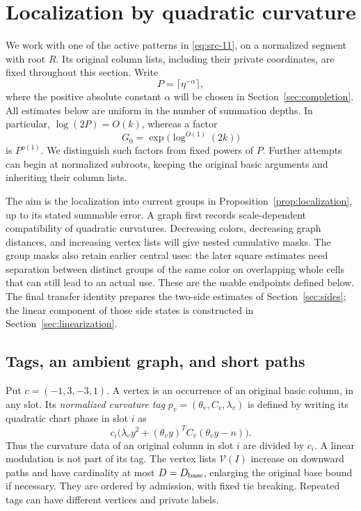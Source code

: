 \section{Localization by quadratic curvature}
\label{sec:localization}

We work with one of the active patterns in \eqref{eq:src-11}, on a
normalized segment with root $R$.  Its original column lists, including their
private coordinates, are fixed throughout this section.  Write
\[
 P=\lceil\eta^{-\alpha}\rceil,
\]
where the positive absolute constant $\alpha$ will be chosen in
Section~\ref{sec:completion}.  All estimates below are uniform in the number
of summation depths.  In particular, $\log(2P)=O(k)$, whereas a factor
\[
 G_0=\exp\bigl(\log^{O(1)}(2k)\bigr)
\]
is $P^{o(1)}$.  We distinguish such factors from fixed powers of $P$.
Further attempts can begin at normalized subroots, keeping the original
basic arguments and inheriting their column lists.

The aim is the localization into current groups in
Proposition~\ref{prop:localization}, up to its stated summable error.
A graph first records scale-dependent compatibility of quadratic
curvatures.  Decreasing colors, decreasing graph distances, and
increasing vertex lists will give nested cumulative masks.  The group
masks also retain earlier central uses: the later square estimates need
separation between distinct groups of the same color on overlapping
whole cells that can still lead to an actual use.  These are the usable
endpoints defined below.  The final transfer identity prepares the
two-side estimates of Section~\ref{sec:sides}; the linear component of
those side states is constructed in Section~\ref{sec:linearization}.

\subsection{Tags, an ambient graph, and short paths}

Put $c=(-1,3,-3,1)$.  A vertex is an occurrence of an original basic
column, in any slot.  Its \emph{normalized curvature tag}
$p_v=(\theta_v,C_v,\lambda_v)$ is defined by writing its quadratic chart
phase in slot $i$ as
\[
 c_i\bigl(\lambda_v y^2+(\theta_v y)^T C_v(\theta_v y-n)\bigr).
\]
Thus the curvature data of an original column in slot $i$ are divided by
$c_i$.  A linear modulation is not part of its tag.  The vertex lists
$\mathcal V(I)$ increase on downward paths and have cardinality at most
$D=D_{\rm base}$, enlarging the original base bound if necessary.  They are
ordered by admission, with fixed tie breaking.  Repeated tags can have
different vertices and private labels.

